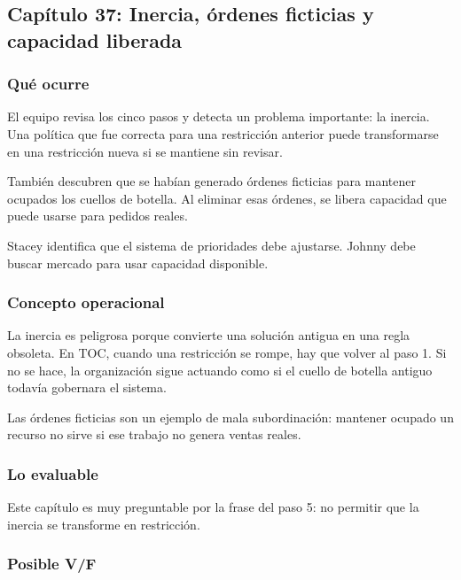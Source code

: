 \documentclass[
  11pt,
]{article}
\begin{document}
\hypertarget{capuxedtulo-37-inercia-uxf3rdenes-ficticias-y-capacidad-liberada}{%
\subsection{Capítulo 37: Inercia, órdenes ficticias y capacidad
liberada}\label{capuxedtulo-37-inercia-uxf3rdenes-ficticias-y-capacidad-liberada}}

\hypertarget{quuxe9-ocurre-10}{%
\subsubsection{Qué ocurre}\label{quuxe9-ocurre-10}}

El equipo revisa los cinco pasos y detecta un problema importante: la
inercia. Una política que fue correcta para una restricción anterior
puede transformarse en una restricción nueva si se mantiene sin revisar.

También descubren que se habían generado órdenes ficticias para mantener
ocupados los cuellos de botella. Al eliminar esas órdenes, se libera
capacidad que puede usarse para pedidos reales.

Stacey identifica que el sistema de prioridades debe ajustarse. Johnny
debe buscar mercado para usar capacidad disponible.

\hypertarget{concepto-operacional-10}{%
\subsubsection{Concepto operacional}\label{concepto-operacional-10}}

La inercia es peligrosa porque convierte una solución antigua en una
regla obsoleta. En TOC, cuando una restricción se rompe, hay que volver
al paso 1. Si no se hace, la organización sigue actuando como si el
cuello de botella antiguo todavía gobernara el sistema.

Las órdenes ficticias son un ejemplo de mala subordinación: mantener
ocupado un recurso no sirve si ese trabajo no genera ventas reales.

\hypertarget{lo-evaluable-10}{%
\subsubsection{Lo evaluable}\label{lo-evaluable-10}}

Este capítulo es muy preguntable por la frase del paso 5: no permitir
que la inercia se transforme en restricción.

\hypertarget{posible-vf-10}{%
\subsubsection{Posible V/F}\label{posible-vf-10}}
\end{document}
